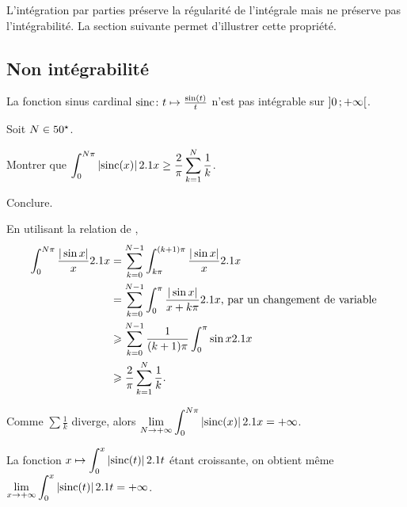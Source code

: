 \begin{remarque}
L'intégration par parties préserve la régularité de l'intégrale mais ne préserve pas l'intégrabilité. La section suivante permet d'illustrer cette propriété.
\end{remarque}

\subsection{Non intégrabilité}

\begin{prop}
    La fonction sinus cardinal $\fonctionligne[\mathrm{sinc}]{t}{\frac{\sin(t)}{t}}$ n'est pas intégrable sur $\interoo{0}{+\infty}$.
\end{prop}


\begin{exercice}
Soit $N \in \Ne$.
\begin{questions}
\item Montrer que $\displaystyle\int_0^{N\pi} \module{\mathrm{sinc}(x)} \d x \geq \frac{2}{\pi} \sum_{k=1}^N \frac{1}{k}$.

\item Conclure.
\end{questions}
\end{exercice}

\begin{demo}
\begin{reponses}
\item En utilisant la relation de ,
    \begin{align*}
        \int_0^{N \pi} \frac{|\sin x|}{x} \d x &= \sum_{k=0}^{N-1} \int_{k \pi}^{(k+1) \pi} \frac{|\sin x|}{x} \d x \\
&= \sum_{k=0}^{N-1} \int_0^\pi \frac{|\sin x|}{x + k \pi} \d x        \text{, par un changement de variable }  \\
        &\geqslant \sum_{k=0}^{N-1} \frac{1}{(k+1) \pi} \int_0^\pi \sin x \d x \\
        &\geqslant \frac{2}{\pi} \sum_{k=1}^N \frac{1}{k}.
        \end{align*}

\item Comme $\sum \frac{1}{k}$ diverge, alors $\displaystyle\lim\limits_{N\to+\infty} \int_0^{N\pi} \module{\mathrm{sinc}(x)} \d x = +\infty$.

La fonction $x \mapsto \displaystyle\int_0^x \module{\mathrm{sinc}(t)} \d t$ étant croissante, on obtient même $\displaystyle \lim_{x\to+\infty} \int_0^x \module{\mathrm{sinc}(t)} \d t = +\infty$.
\end{reponses}
\end{demo}

